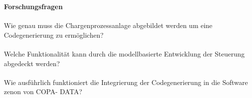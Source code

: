 \textbf{Forschungsfragen}\\\\
Wie genau muss die Chargenprozessanlage abgebildet werden um eine Codegenerierung zu ermöglichen? \\\\
Welche Funktionalität kann durch die modellbasierte Entwicklung der Steuerung abgedeckt werden?\\\\
Wie ausführlich funktioniert die Integrierung der Codegenerierung in die Software zenon von COPA- DATA? 